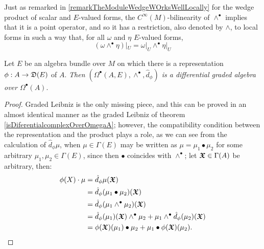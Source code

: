\begin{remark}\label{remarkWedgeofEVectorValuedFOrmsRestrictedLocal}
Just as remarked in \ref{remarkTheModuleWedgeWOrksWellLocally} for the wedge product of scalar and $E$-valued forms, the $C^\infty(M)$-bilinearity of $\wedge^\bullet$ implies that it is a point operator, and so it has a restriction, also denoted by $\wedge$, to local forms in such a way that, for all $\omega$ and $\eta$ $E$-valued forms,
\begin{equation}
    (\omega \wedge^\bullet \eta)|_U = \omega|_U \wedge^\bullet \eta|_U
\end{equation}
\end{remark}

\begin{theorem} \label{theoFormsAreDiffGAlgebebra}
Let $E$ be an algebra bundle over $M$ on which there is a representation $\phi: A \to \alg D(E)$ of $A$. \textit{Then $(\Omega^\bullet(A, E), \wedge^\bullet, \hat d_\phi)$ is a differential graded algebra over $\Omega^\bullet(A)$}.
\end{theorem}

\begin{proof}
Graded Leibniz is the only missing piece, and this can be proved in an almost identical manner as the graded Leibniz of theorem \ref{isDiferentialcomplexOverOmegaA}; however, the compatibility condition between the representation and the product plays a role, as we can see from the calculation of $\hat d_\phi \mu$, when $\mu \in \Gamma(E)$ may be written as $\mu = \mu_1 \bullet \mu_2$ for some arbitrary $\mu_1, \mu_2 \in \Gamma(E)$, since then $\bullet$ coincides with $\wedge^\bullet$; let $\bm{\mathfrak{X}} \in \Gamma(A)$ be arbitrary, then:
\begin{align*}
    \phi(X) \cdot \mu &= \hat d_\phi \mu(\sectoid X)\\
        &= \hat d_\phi (\mu_1 \bullet \mu_2)(\sectoid X) \\
        &= \hat d_\phi (\mu_1 \wedge^\bullet \mu_2)(\sectoid X)\\
        &= \hat d_\phi(\mu_1)(\sectoid X) \wedge^\bullet \mu_2 + \mu_1 \wedge^\bullet \hat d_\phi(\mu_2)(\sectoid X)\\
        &= \phi(\sectoid X)(\mu_1) \bullet \mu_2 + \mu_1 \bullet \phi(\sectoid X)(\mu_2).
\end{align*}

\end{proof}

